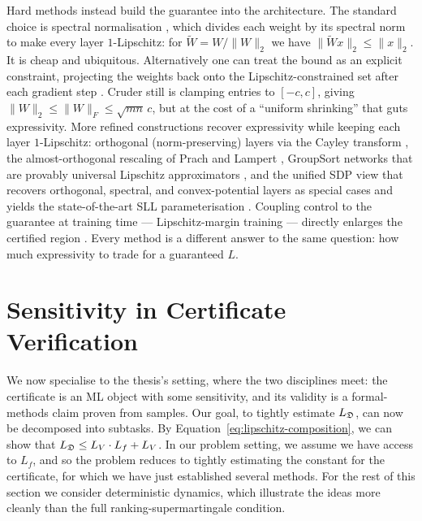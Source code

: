 Hard methods instead build the guarantee into the architecture. The standard choice is spectral normalisation \cite{miyato2018spectral}, which divides each weight by its spectral norm to make every layer $1$-Lipschitz: for $\tilde W=W/\|W\|_2$ we have $\|\tilde W x\|_2\le\|x\|_2$. It is cheap and ubiquitous. Alternatively one can treat the bound as an explicit constraint, projecting the weights back onto the Lipschitz-constrained set after each gradient step \cite{gouk2021regularisation}. Cruder still is clamping entries to $[-c,c]$, giving $\|W\|_2\le\|W\|_F\le\sqrt{mn}\,c$, but at the cost of a ``uniform shrinking'' that guts expressivity. More refined constructions recover expressivity while keeping each layer $1$-Lipschitz: orthogonal (norm-preserving) layers via the Cayley transform \cite{trockman2021orthogonalizing}, the almost-orthogonal rescaling of Prach and Lampert \cite{prach2022almost}, GroupSort networks that are provably universal Lipschitz approximators \cite{anil2019sorting}, and the unified SDP view that recovers orthogonal, spectral, and convex-potential layers as special cases and yields the state-of-the-art SLL parameterisation \cite{araujo2023unified}. Coupling control to the guarantee at training time --- Lipschitz-margin training --- directly enlarges the certified region \cite{tsuzuku2018lipschitz}. Every method is a different answer to the same question: how much expressivity to trade for a guaranteed $L$.


\section{Sensitivity in Certificate Verification}
\label{sec:certdrift}

We now specialise to the thesis's setting, where the two disciplines meet: the certificate is an ML object with some sensitivity, and its validity is a formal-methods claim proven from samples. Our goal, to tightly estimate $L_{\mathfrak{D}}$, can now be decomposed into subtasks. By Equation~\eqref{eq:lipschitz-composition}, we can show that $L_{\mathfrak{D}} \le L_V \cdot L_f + L_V$. In our problem setting, we assume we have access to $L_f$, and so the problem reduces to tightly estimating the constant for the certificate, for which we have just established several methods. For the rest of this section we consider deterministic dynamics, which illustrate the ideas more cleanly than the full ranking-supermartingale condition.

